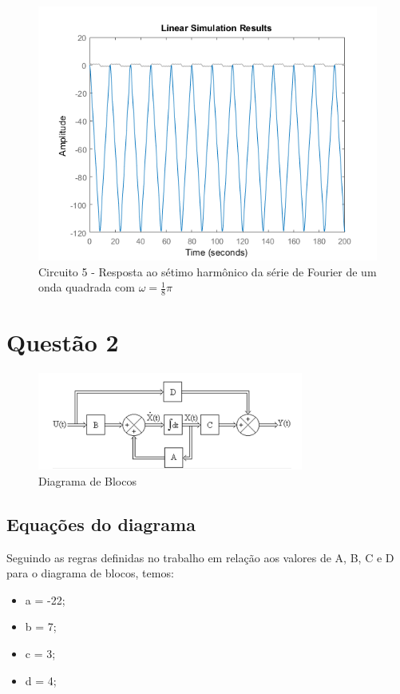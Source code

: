 \documentclass[a4paper, 12pt]{article}
\begin{document}
			\begin{figure}[!ht]
				\centering
				\includegraphics[scale=0.71]{img/1m_circ5.png}
				\caption{Circuito 5 - Resposta ao sétimo harmônico da série de Fourier de um onda quadrada com $\omega = \frac{1}{8}\pi$}	
			\end{figure}						
									
	\clearpage
	\section{Quest\~{a}o 2}
	
	\begin{figure}[!ht]
		\centering
		\includegraphics{img/db.png}
		\caption{Diagrama de Blocos}	
	\end{figure}	
	\subsection{Equações do diagrama}
	Seguindo as regras definidas no trabalho em relação aos valores de A, B, C e D para o diagrama de blocos, temos:
		\begin{itemize}
			\item a = -22;
			\item b = 7;
			\item c = 3;
			\item d = 4;
		\end{itemize}		
		
\end{document}

